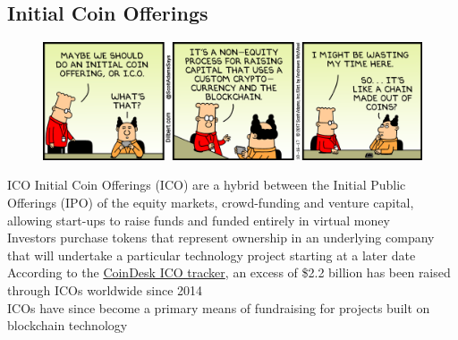 \documentclass[9pt]{beamer}
\begin{document}


\subsection{Initial Coin Offerings}


\begin{frame}
	\begin{figure}[]
		\centering
		\includegraphics  [scale=0.07]{Images/dilbert-ico}
	\end{figure}
\end{frame}


\begin{frame}{ICO}
	Initial Coin Offerings (ICO) are a hybrid between the Initial Public Offerings (IPO) of the equity markets, crowd-funding and venture capital, allowing start-ups to raise funds and funded entirely in virtual money\\ \vspace{3mm}
	Investors purchase tokens that represent ownership in an underlying company that will undertake a particular technology project starting at a later date \\ \vspace{3mm}
	According to the \href{https://www.coindesk.com/ico-tracker/}{CoinDesk ICO tracker}, an excess of \$2.2 billion has been raised through ICOs worldwide since 2014 \\ \vspace{3mm}
	ICOs have since become a primary means of fundraising for projects built on blockchain technology
\end{frame}
\end{document}
